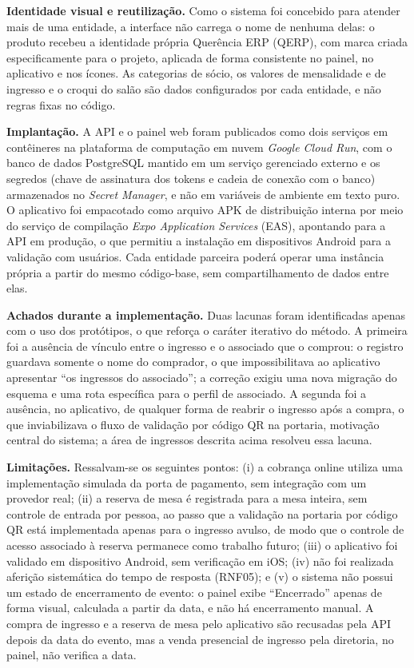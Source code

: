 \documentclass[12pt,a4paper]{article}
\begin{document}
\textbf{Identidade visual e reutilização.} Como o sistema foi concebido para atender mais de uma
entidade, a interface não carrega o nome de nenhuma delas: o produto recebeu a identidade própria
Querência ERP (QERP), com marca criada especificamente para o projeto, aplicada de forma consistente no
painel, no aplicativo e nos ícones. As categorias de sócio, os valores de mensalidade e de ingresso
e o croqui do salão são dados configurados por cada entidade, e não regras fixas no código.

\textbf{Implantação.} A API e o painel web foram publicados como dois serviços em contêineres na
plataforma de computação em nuvem \textit{Google Cloud Run}, com o banco de dados PostgreSQL mantido em
um serviço gerenciado externo e os segredos (chave de assinatura dos tokens e cadeia de conexão com o
banco) armazenados no \textit{Secret Manager}, e não em variáveis de ambiente em texto puro. O
aplicativo foi empacotado como arquivo APK de distribuição interna por meio do serviço de compilação
\textit{Expo Application Services} (EAS), apontando para a API em produção, o que permitiu a
instalação em dispositivos Android para a validação com usuários. Cada entidade parceira poderá
operar uma instância própria a partir do mesmo código-base, sem compartilhamento de dados entre elas.

\textbf{Achados durante a implementação.} Duas lacunas foram identificadas apenas com o uso dos
protótipos, o que reforça o caráter iterativo do método. A primeira foi a ausência de vínculo entre o
ingresso e o associado que o comprou: o registro guardava somente o nome do comprador, o que
impossibilitava ao aplicativo apresentar ``os ingressos do associado''; a correção exigiu uma nova
migração do esquema e uma rota específica para o perfil de associado. A segunda foi a ausência, no
aplicativo, de qualquer forma de reabrir o ingresso após a compra, o que inviabilizava o fluxo de
validação por código QR na portaria, motivação central do sistema; a área de ingressos descrita
acima resolveu essa lacuna.

\textbf{Limitações.} Ressalvam-se os seguintes pontos: (i) a cobrança online utiliza uma
implementação simulada da porta de pagamento, sem integração com um provedor real; (ii) a reserva de
mesa é registrada para a mesa inteira, sem controle de entrada por pessoa, ao passo que a validação
na portaria por código QR está implementada apenas para o ingresso avulso, de modo que o controle de
acesso associado à reserva permanece como trabalho futuro; (iii) o aplicativo foi validado em
dispositivo Android, sem verificação em iOS; (iv) não foi realizada aferição sistemática do tempo de
resposta (RNF05); e (v) o sistema não possui um estado de encerramento de evento: o painel exibe ``Encerrado''
apenas de forma visual, calculada a partir da data, e não há encerramento manual. A compra de
ingresso e a reserva de mesa pelo aplicativo são recusadas pela API depois da data do evento, mas a
venda presencial de ingresso pela diretoria, no painel, não verifica a data.
\end{document}
